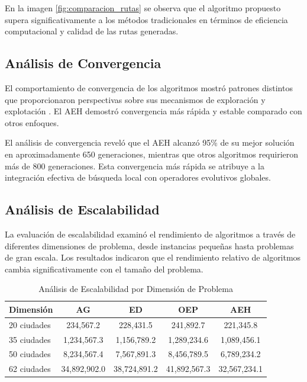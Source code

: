\documentclass[10pt,a4paper]{article}
\begin{document}
En la imagen \ref{fig:comparacion_rutas} se observa que el algoritmo propuesto supera significativamente a los métodos tradicionales en términos de eficiencia computacional y calidad de las rutas generadas.

\subsection{Análisis de Convergencia}

El comportamiento de convergencia de los algoritmos mostró patrones distintos que proporcionaron perspectivas sobre sus mecanismos de exploración y explotación . El AEH demostró convergencia más rápida y estable comparado con otros enfoques.

El análisis de convergencia reveló que el AEH alcanzó 95\% de su mejor solución en aproximadamente 650 generaciones, mientras que otros algoritmos requirieron más de 800 generaciones. Esta convergencia más rápida se atribuye a la integración efectiva de búsqueda local con operadores evolutivos globales.

\subsection{Análisis de Escalabilidad}

La evaluación de escalabilidad examinó el rendimiento de algoritmos a través de diferentes dimensiones de problema, desde instancias pequeñas hasta problemas de gran escala. Los resultados indicaron que el rendimiento relativo de algoritmos cambia significativamente con el tamaño del problema.

\begin{table}[H]
\centering
\caption{Análisis de Escalabilidad por Dimensión de Problema}
\begin{tabular}{@{}lcccc@{}}
\toprule
\textbf{Dimensión} & \textbf{AG} & \textbf{ED} & \textbf{OEP} & \textbf{AEH} \\
\midrule
20 ciudades & 234,567.2 & 228,431.5 & 241,892.7 & 221,345.8 \\
35 ciudades & 1,234,567.3 & 1,156,789.2 & 1,289,234.6 & 1,089,456.1 \\
50 ciudades & 8,234,567.4 & 7,567,891.3 & 8,456,789.5 & 6,789,234.2 \\
62 ciudades & 34,892,902.0 & 38,724,891.2 & 41,892,567.3 & 32,567,234.1 \\
\bottomrule
\end{tabular}
\label{tab:scalability}
\end{table}
\end{document}
